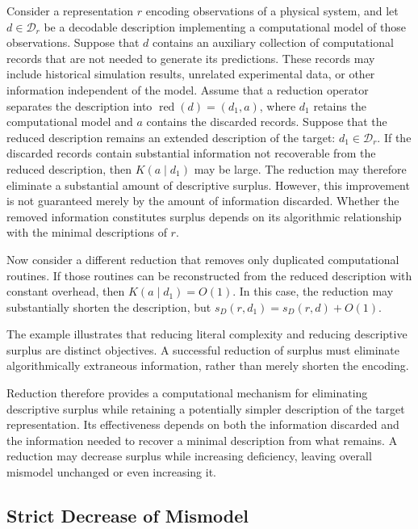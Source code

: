 \begin{example}
Consider a representation $r$ encoding observations of a physical system, and let $d\in\mathcal D_r$ be a decodable description implementing a computational model of those observations. Suppose that $d$ contains an auxiliary collection of computational records that are not needed to generate its predictions. These records may include historical simulation results, unrelated experimental data, or other information independent of the model. Assume that a reduction operator separates the description into $\operatorname{red}(d)=(d_1,a)$, where $d_1$ retains the computational model and $a$ contains the discarded records. Suppose that the reduced description remains an extended description of the target: $d_1\in\mathcal D_r$. If the discarded records contain substantial information not recoverable from the reduced description, then $K(a\mid d_1)$ may be large. The reduction may therefore eliminate a substantial amount of descriptive surplus. However, this improvement is not guaranteed merely by the amount of information discarded. Whether the removed information constitutes surplus depends on its algorithmic relationship with the minimal descriptions of $r$.

Now consider a different reduction that removes only duplicated computational routines. If those routines can be reconstructed from the reduced description with constant overhead, then $K(a\mid d_1)=O(1)$. In this case, the reduction may substantially shorten the description, but $s_D(r,d_1)=s_D(r,d)+O(1)$.
\end{example}

The example illustrates that reducing literal complexity and reducing descriptive surplus are distinct objectives. A successful reduction of surplus must eliminate algorithmically extraneous information, rather than merely shorten the encoding.

Reduction therefore provides a computational mechanism for eliminating descriptive surplus while retaining a potentially simpler description of the target representation. Its effectiveness depends on both the information discarded and the information needed to recover a minimal description from what remains. A reduction may decrease surplus while increasing deficiency, leaving overall mismodel unchanged or even increasing it.


\subsection*{Strict Decrease of Mismodel}

